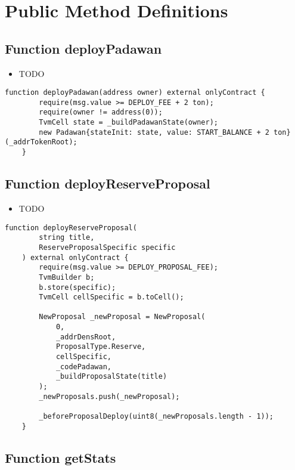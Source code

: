 \section{Public Method Definitions}


\subsection{Function deployPadawan}

\begin{itemize}
\item TODO
\end{itemize}

\begin{lstlisting}[firstnumber=103]
    function deployPadawan(address owner) external onlyContract {
        require(msg.value >= DEPLOY_FEE + 2 ton);
        require(owner != address(0));
        TvmCell state = _buildPadawanState(owner);
        new Padawan{stateInit: state, value: START_BALANCE + 2 ton}(_addrTokenRoot);
    }
\end{lstlisting}

\subsection{Function deployReserveProposal}

\begin{itemize}
\item TODO
\end{itemize}

\begin{lstlisting}[firstnumber=112]
    function deployReserveProposal(
        string title,
        ReserveProposalSpecific specific
    ) external onlyContract {
        require(msg.value >= DEPLOY_PROPOSAL_FEE);
        TvmBuilder b;
        b.store(specific);
        TvmCell cellSpecific = b.toCell();

        NewProposal _newProposal = NewProposal(
            0,
            _addrDensRoot,
            ProposalType.Reserve,
            cellSpecific,
            _codePadawan,
            _buildProposalState(title)
        );
        _newProposals.push(_newProposal);
        
        _beforeProposalDeploy(uint8(_newProposals.length - 1));
    }
\end{lstlisting}

\subsection{Function getStats}

